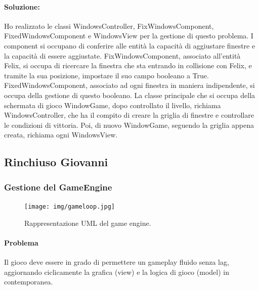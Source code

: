 \documentclass[a4paper,12pt]{report}
\begin{document}
\paragraph{Soluzione:}

Ho realizzato le classi WindowsController, FixWindowsComponent, FixedWindowsComponent e WindowsView per la gestione di questo problema. 
I component  si occupano di conferire alle entità la capacità di aggiustare finestre e la capacità di essere aggiustate.
FixWindowsComponent, associato all'entità Felix, si occupa di ricercare la finestra che sta entrando in collisione con Felix, e tramite la sua posizione, impostare il suo campo booleano a True.
FixedWindowsComponent, associato ad ogni finestra in maniera indipendente, si occupa della gestione di questo booleano.
La classe principale che si occupa della schermata di gioco WindowGame, dopo controllato il livello, richiama WindowsController, che ha il compito di creare la griglia di finestre e controllare le condizioni di vittoria.
Poi, di nuovo WindowGame, seguendo la griglia appena creata, richiama ogni WindowsView.



\subsection{Rinchiuso Giovanni}

\subsubsection{Gestione del GameEngine}

\begin{figure}[H]
\centering{}
\texttt{[image: img/gameloop.jpg]}
\caption{Rappresentazione UML del game engine.}
\end{figure}

\paragraph{Problema} Il gioco deve essere in grado di permettere un gameplay fluido senza lag, aggiornando ciclicamente la grafica (view) e la logica di gioco (model) in contemporanea.
\end{document}
